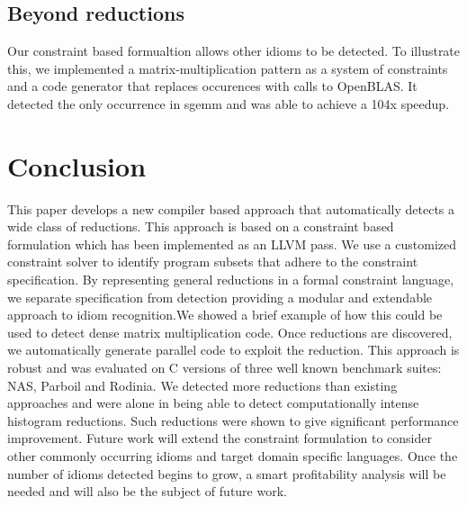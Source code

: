 
\subsection{Beyond reductions}

Our constraint based formualtion allows other idioms to be detected. To 
illustrate this, we implemented a matrix-multiplication pattern as a 
system of constraints and a code generator that
replaces occurences with calls to OpenBLAS. 
It detected the only occurrence in sgemm and was able to achieve a 104x speedup.

\section{Conclusion}

This paper develops a new compiler based approach that
automatically detects a wide class of reductions. 
This approach is based on a constraint based formulation which has
been implemented as an LLVM pass. We use a customized constraint
solver to identify program subsets that adhere to the constraint
specification.  By representing general reductions in a formal
constraint language, we separate specification from detection
providing a modular and extendable approach to idiom recognition.We
showed a brief example of how this could be used to detect dense
matrix multiplication code.  Once reductions are discovered, we
automatically generate parallel code to exploit the reduction. This
approach is robust and was evaluated on C versions of three well known
benchmark suites: NAS, Parboil and Rodinia. We detected 
more reductions than existing approaches and were alone in being able
to detect computationally intense  histogram reductions. Such
reductions were shown to give significant performance improvement.
Future work will extend the constraint formulation to consider other
commonly occurring idioms and target domain specific languages. Once the number of idioms detected begins to grow, a smart profitability analysis will be needed and will also be the subject of future work.



